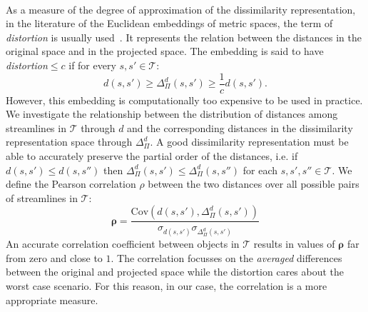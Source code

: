 \\As a measure of the degree of approximation of the dissimilarity representation, in the literature of the Euclidean embeddings of metric spaces, the term of \emph{distortion} is usually used~\cite{linial1995geometry}.
It represents the relation between the distances in the original space and 
in the projected space. 
The embedding is said to have \emph{distortion}$\leq c$ if for every $s,s' \in \mathcal{T}$:
\begin{equation}
  \label{eq:distortion}
  d(s,s') \geq \Delta_{\Pi}^d(s,s') \geq \frac{1}{c} d(s,s').
\end{equation}
However, this embedding is computationally too expensive to be used in practice. We investigate the relationship between the distribution of distances among streamlines in $\mathcal{T}$ through $d$ and the corresponding distances in the dissimilarity representation space through $\Delta_{\Pi}^d$. A good dissimilarity representation must be able to accurately preserve the partial order of the distances, i.e. if $d(s,s') \leq d(s,s'')$ then $\Delta_{\Pi}^d(s,s') \leq \Delta_{\Pi}^d(s,s'')$ for each $s,s',s'' \in \mathcal{T}$. We define the Pearson correlation %
$\rho$ between the two distances over all possible pairs of streamlines in $\mathcal{T}$:
\begin{equation}
  \label{eq:accuracy_correlation}
  \boldsymbol{\rho} = \frac{\mathrm{Cov}(d(s,s'),
    \Delta_{\Pi}^d(s,s'))}{\sigma_{d(s,s')} \sigma_{\Delta_{\Pi}^d(s,s')}}
\end{equation}
An accurate correlation coefficient between
objects in $\mathcal{T}$ results in values of $\boldsymbol{\rho}$ far
from zero and close to $1$. The correlation focusses on the
\emph{averaged} differences between the original and projected space
while the distortion cares about the worst case scenario. For this reason, in our case, the correlation is a more appropriate measure. 

